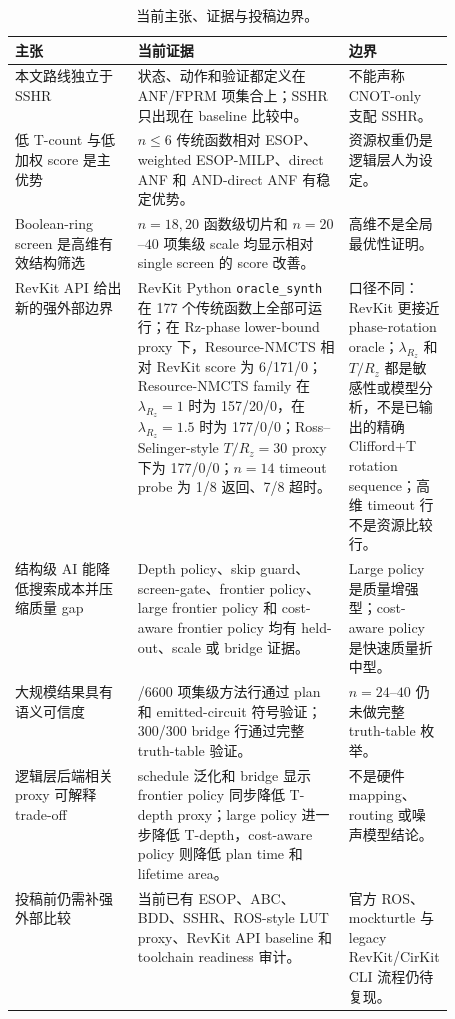 \documentclass[UTF8,fontset=macnew,11pt]{ctexart}
\newcommand{\method}{Resource-NMCTS}
\newcommand{\screen}{Boolean-ring screen}
\newcommand{\anf}{\ensuremath{\mathrm{ANF}}}
\newcommand{\fprm}{\ensuremath{\mathrm{FPRM}}}
\newcommand{\ttable}{truth-table}
\begin{document}
\begin{table}[H]
\centering
\small
\caption{当前主张、证据与投稿边界。}
\label{tab:evidence-map}
\begin{tabularx}{\linewidth}{>{\raggedright\arraybackslash}p{0.28\linewidth}>{\raggedright\arraybackslash}X>{\raggedright\arraybackslash}p{0.23\linewidth}}
\toprule
主张 & 当前证据 & 边界 \\
\midrule
本文路线独立于 SSHR & 状态、动作和验证都定义在 \anf{}/\fprm{} 项集合上；SSHR 只出现在 baseline 比较中。 & 不能声称 CNOT-only 支配 SSHR。 \\
低 T-count 与低加权 score 是主优势 & $n\leq6$ 传统函数相对 ESOP、weighted ESOP-MILP、direct ANF 和 AND-direct ANF 有稳定优势。 & 资源权重仍是逻辑层人为设定。 \\
\screen{} 是高维有效结构筛选 & $n=18,20$ 函数级切片和 $n=20$--$40$ 项集级 scale 均显示相对 single screen 的 score 改善。 & 高维不是全局最优性证明。 \\
RevKit API 给出新的强外部边界 & RevKit Python \texttt{oracle\_synth} 在 177 个传统函数上全部可运行；在 Rz-phase lower-bound proxy 下，\method{} 相对 RevKit score 为 6/171/0；Resource-NMCTS family 在 $\lambda_{R_z}=1$ 时为 157/20/0，在 $\lambda_{R_z}=1.5$ 时为 177/0/0；Ross--Selinger-style $T/R_z=30$ proxy 下为 177/0/0；$n=14$ timeout probe 为 1/8 返回、7/8 超时。 & 口径不同：RevKit 更接近 phase-rotation oracle；$\lambda_{R_z}$ 和 $T/R_z$ 都是敏感性或模型分析，不是已输出的精确 Clifford+T rotation sequence；高维 timeout 行不是资源比较行。 \\
结构级 AI 能降低搜索成本并压缩质量 gap & Depth policy、skip guard、screen-gate、frontier policy、large frontier policy 和 cost-aware frontier policy 均有 held-out、scale 或 bridge 证据。 & Large policy 是质量增强型；cost-aware policy 是快速质量折中型。 \\
大规模结果具有语义可信度 & 6600/6600 项集级方法行通过 plan 和 emitted-circuit 符号验证；300/300 bridge 行通过完整 \ttable{} 验证。 & $n=24$--$40$ 仍未做完整 \ttable{} 枚举。 \\
逻辑层后端相关 proxy 可解释 trade-off & schedule 泛化和 bridge 显示 frontier policy 同步降低 T-depth proxy；large policy 进一步降低 T-depth，cost-aware policy 则降低 plan time 和 lifetime area。 & 不是硬件 mapping、routing 或噪声模型结论。 \\
投稿前仍需补强外部比较 & 当前已有 ESOP、ABC、BDD、SSHR、ROS-style LUT proxy、RevKit API baseline 和 toolchain readiness 审计。 & 官方 ROS、mockturtle 与 legacy RevKit/CirKit CLI 流程仍待复现。 \\
\bottomrule
\end{tabularx}
\end{table}
\end{document}
